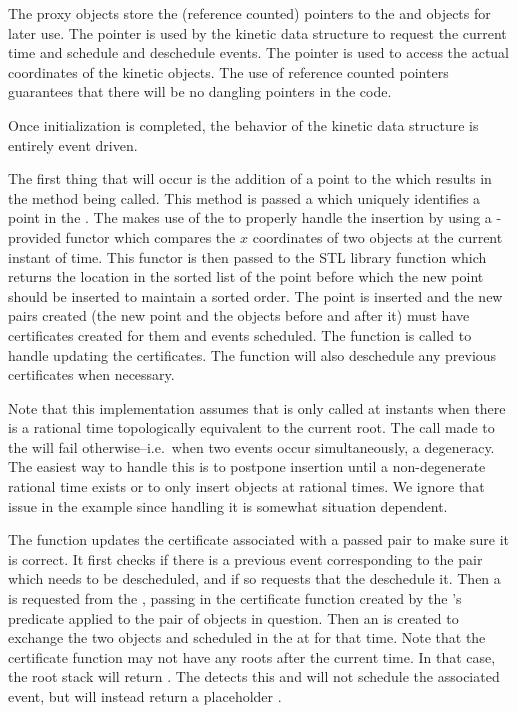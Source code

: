The proxy objects store the (reference counted) pointers to the
 and  objects for later use. The
 pointer is used by the kinetic data structure to
request the current time and schedule and deschedule events. The
 pointer is used to access the actual
coordinates of the kinetic objects. The use of reference counted
pointers guarantees that there will be no dangling pointers in the
code.

 Once initialization is completed, the behavior of the kinetic data
structure is entirely event driven.

The first thing that will occur is the addition of a point to the
 which results in the  method being
called. This method is passed a  which uniquely identifies a
point in the . The
 makes use of the  to properly
handle the insertion by using a -provided
functor which compares the $x$ coordinates of two objects at the
current instant of time. This functor is then passed to the
STL library function
 which returns the location in the sorted list of the
point before which the new point should be inserted to maintain a
sorted order. The point is inserted and the new pairs created (the new
point and the objects before and after it) must have certificates
created for them and events scheduled. The 
function is called to handle updating the certificates. The
 function will also deschedule any previous
certificates when necessary.

Note that this implementation assumes that  is only
called at instants when there is a rational time topologically
equivalent to the current root. The  call made
to the  will fail otherwise--i.e.\ when two events
occur simultaneously, a degeneracy. The easiest way to handle this is
to postpone insertion until a non-degenerate rational time exists or
to only insert objects at rational times. We ignore that issue in the
example since handling it is somewhat situation dependent.

The  function updates the certificate
associated with a passed pair to make sure it is correct. It first
checks if there is a previous event corresponding to the pair which
needs to be descheduled, and if so requests that the 
deschedule it. Then a  is requested from the
, passing in the certificate function created by the
's  predicate applied to the pair of objects in
question. Then an  is created to exchange the two objects
and scheduled in the  at for that time. Note that the
certificate function may not have any roots after the current time. In
that case, the root stack will return
. The 
detects this and will not schedule the associated event, but will
instead return a placeholder .

